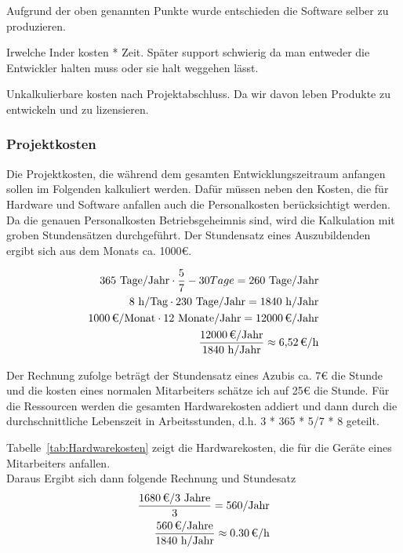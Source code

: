 Aufgrund der oben genannten Punkte wurde entschieden die Software selber zu produzieren. 
  

Irwelche Inder kosten  * Zeit.
Später support schwierig da man entweder die Entwickler halten muss oder sie halt weggehen lässt.

Unkalkulierbare kosten nach Projektabschluss.
Da wir davon leben Produkte zu entwickeln und zu lizensieren. 

\subsubsection{Projektkosten}
\label{sec:Projektkosten}
Die Projektkosten, die während dem gesamten Entwicklungszeitraum anfangen sollen im Folgenden kalkuliert werden. Dafür müssen neben den Kosten, die für Hardware und Software anfallen auch die Personalkosten berücksichtigt werden. Da die genauen Personalkosten Betriebsgeheimnis sind, wird die Kalkulation mit groben Stundensätzen durchgeführt. Der Stundensatz eines Auszubildenden ergibt sich aus dem Monats ca. 1000€.
		
\begin{eqnarray}
	365 \mbox{ Tage/Jahr} \cdot \frac{5}{7} - 30 Tage = 260 \mbox{ Tage/Jahr}\\
	8 \mbox{ h/Tag} \cdot 230 \mbox{ Tage/Jahr} = 1840 \mbox{ h/Jahr}\\
	\eur{1000}\mbox{/Monat} \cdot 12 \mbox{ Monate/Jahr} = \eur{12000} \mbox{/Jahr}\\
	\frac{\eur{12000} \mbox{/Jahr}}{1840 \mbox{ h/Jahr}} \approx \eur{6,52}\mbox{/h}
\end{eqnarray}
	
Der Rechnung zufolge beträgt der Stundensatz eines Azubis ca. 7€ die Stunde und die kosten eines normalen Mitarbeiters schätze ich auf 25€ die Stunde. Für die Ressourcen werden die gesamten Hardwarekosten addiert und dann durch die durchschnittliche Lebenszeit in Arbeitsstunden, d.h. 3 * 365 * 5/7 * 8 geteilt.
	
Tabelle~\ref{tab:Hardwarekosten} zeigt die Hardwarekosten, die für die Geräte eines Mitarbeiters anfallen.
\\
	
Daraus Ergibt sich dann folgende Rechnung und Stundesatz
\begin{eqnarray}
	\frac{\eur{1680} \mbox{/3 Jahre}}{3} = 560 \mbox{/Jahr}\\
	\frac{\eur{560} \mbox{/Jahre}}{1840 \mbox{ h/Jahr}} \approx \eur{0.30}\mbox{/h}
\end{eqnarray}

